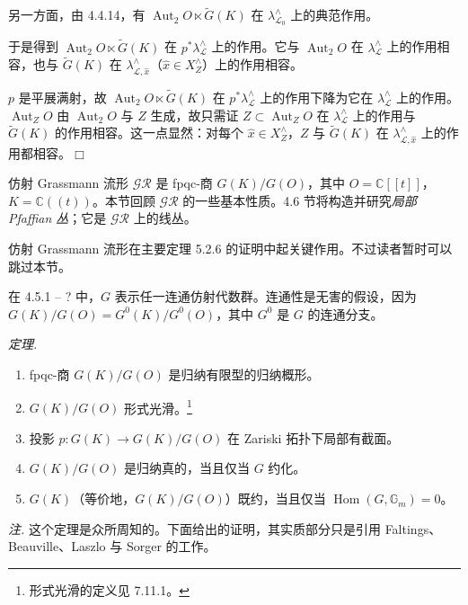 另一方面，由 4.4.14，有 $\operatorname{Aut}_2 O\ltimes\widetilde{G}(K)$ 在 $\lambda^{\wedge}_{\mathcal{L}_0}$ 上的典范作用。

于是得到 $\operatorname{Aut}_2 O\ltimes\widetilde{G}(K)$ 在 $p^*\lambda^{\wedge}_{\mathcal{L}}$ 上的作用。它与 $\operatorname{Aut}_2 O$ 在 $\lambda^{\wedge}_{\mathcal{L}}$ 上的作用相容，也与 $\widetilde{G}(K)$ 在 $\lambda^{\wedge}_{\mathcal{L},\hat x}$（$\hat x\in X^{\wedge}_Z$）上的作用相容。

$p$ 是平展满射，故 $\operatorname{Aut}_2 O\ltimes\widetilde{G}(K)$ 在 $p^*\lambda^{\wedge}_{\mathcal{L}}$ 上的作用下降为它在 $\lambda^{\wedge}_{\mathcal{L}}$ 上的作用。$\operatorname{Aut}_Z O$ 由 $\operatorname{Aut}_2 O$ 与 $Z$ 生成，故只需证 $Z\subset\operatorname{Aut}_Z O$ 在 $\lambda^{\wedge}_{\mathcal{L}}$ 上的作用与 $\widetilde{G}(K)$ 的作用相容。这一点显然：对每个 $\hat x\in X^{\wedge}_Z$，$Z$ 与 $\widetilde{G}(K)$ 在 $\lambda^{\wedge}_{\mathcal{L},\hat x}$ 上的作用都相容。\hfill$\Box$


仿射 Grassmann 流形 $\mathcal{GR}$ 是 fpqc-商 $G(K)/G(O)$，其中 $O=\mathbb{C}[[t]]$，$K=\mathbb{C}((t))$。本节回顾 $\mathcal{GR}$ 的一些基本性质。4.6 节将构造并研究\emph{局部 Pfaffian 丛}；它是 $\mathcal{GR}$ 上的线丛。

仿射 Grassmann 流形在主要定理 5.2.6 的证明中起关键作用。不过读者暂时可以跳过本节。

在 4.5.1 – ? 中，$G$ 表示任一连通仿射代数群。连通性是无害的假设，因为 $G(K)/G(O)=G^0(K)/G^0(O)$，其中 $G^0$ 是 $G$ 的连通分支。

 \emph{定理.}
\begin{enumerate}[label=(\roman*),leftmargin=2.2em]
\item fpqc-商 $G(K)/G(O)$ 是归纳有限型的归纳概形。
\item $G(K)/G(O)$ 形式光滑。\footnote{形式光滑的定义见 7.11.1。}
\item 投影 $p:G(K)\to G(K)/G(O)$ 在 Zariski 拓扑下局部有截面。
\item $G(K)/G(O)$ 是归纳真的，当且仅当 $G$ 约化。
\item $G(K)$（等价地，$G(K)/G(O)$）既约，当且仅当 $\operatorname{Hom}(G,\mathbb{G}_m)=0$。
\end{enumerate}

\emph{注.} 这个定理是众所周知的。下面给出的证明，其实质部分只是引用 Faltings、Beauville、Laszlo 与 Sorger 的工作。

